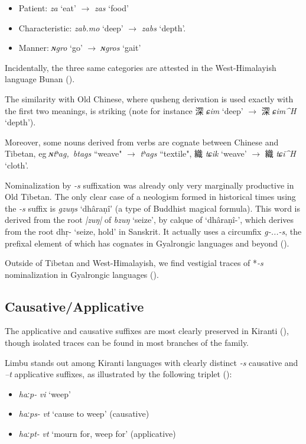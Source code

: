 \documentclass[oneside,a4paper,11pt]{article}
\newcommand{\ipa}[1]{{\phon\textit{\mbox{#1}}}}
\newcommand{\zh}[1]{{\cn#1}}
\newcommand{\ch}[3]{\zh{#1} \ipa{#2} `#3'}
\begin{document}
\begin{itemize}
\item Patient: \ipa{za} `eat' $\rightarrow$ \ipa{zas} `food' 
\item Characteristic: \ipa{zab.mo} `deep'  $\rightarrow$ \ipa{zabs} `depth'.
\item Manner: \ipa{ɴgro} `go'  $\rightarrow$ \ipa{ɴgros} `gait' 
 \end{itemize}
 
Incidentally, the three same categories are attested in the West-Himalayish language Bunan (\citealt[179-180]{widmer14bunan}).

The similarity with Old Chinese, where qusheng derivation is used exactly with the first two meanings, is striking (note for instance \ch{深}{ɕim}{deep} $\rightarrow$ \ch{深}{ɕim^H}{depth}).

Moreover, some nouns derived from verbs are cognate between Chinese and Tibetan, eg \ipa{ɴtʰag, btags} ``weave" $\rightarrow$ \ipa{tʰags} ``textile", \ch{織}{tɕik}{weave} $\rightarrow$ \ch{織}{tɕi^H}{cloth}.

Nominalization by \ipa{-s} suffixation was already only very marginally productive in Old Tibetan. The only clear case of a neologism formed in historical times using the \ipa{-s} suffix is \ipa{gzuŋs} `dhâraṇî' (a type of Buddhist magical formula). This word is derived from the root \ipa{|zuŋ|} of \ipa{bzuŋ} `seize', by calque of `dhâraṇî-', which derives from the root dhṛ- `seize, hold' in Sanskrit. It actually uses a circumfix \ipa{g-...-s}, the prefixal element of which has cognates in Gyalrongic languages and beyond (\citealt{konnerth16gV, jacques14snom}).

Outside of Tibetan and West-Himalayish, we find vestigial traces of *\ipa{-s} nominalization in Gyalrongic languages (\citealt{jacques03s.houzhui, jackson14morpho}).

 \subsection{Causative/Applicative} \label{sec:causative}
The applicative and causative suffixes are most clearly preserved in Kiranti (\citealt{michailovsky85dental, jacques15derivational.khaling}), though isolated traces can be found in most branches of the family.

Limbu stands out among Kiranti languages with clearly distinct \ipa{-s} causative and \ipa{--t} applicative suffixes, as illustrated by the following triplet (\citealt{michailovsky02dico}):
\begin{itemize}
\item \ipa{haːp-} \textit{vi} `weep'
\item \ipa{haːps-} \textit{vt} `cause to weep' (causative)
\item \ipa{haːpt-} \textit{vt} `mourn for, weep for' (applicative)
\end{itemize}
\end{document}
